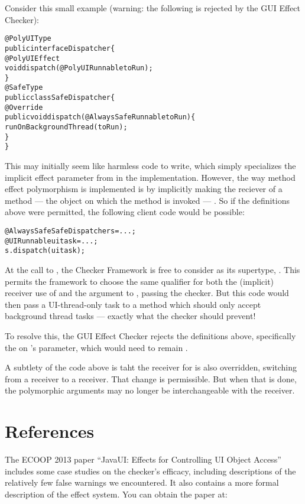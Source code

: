 Consider this small example (warning: the following is rejected by the GUI Effect Checker):

\begin{alltt}
@PolyUIType
public interface Dispatcher \{
    @PolyUIEffect
    void dispatch(@PolyUI Runnable toRun);
\}
@SafeType
public class SafeDispatcher \{
    @Override
    public void dispatch(@AlwaysSafe Runnable toRun) \{
        runOnBackgroundThread(toRun);
    \}
\}
\end{alltt}

This may initially seem like harmless code to write, which simply specializes the implicit effect
parameter from  in the  implementation.  However, the way
method effect polymorphism is implemented is by implicitly making the reciever of a
 method --- the object on which the method is invoked --- .  So
if the definitions above were permitted, the following client code would be possible:

\begin{alltt}
@AlwaysSafe SafeDispatcher s = ...;
@UI Runnable uitask = ...;
s.dispatch(uitask);
\end{alltt}

At the call to , the Checker Framework is free to consider  as its
supertype, .  This permits the framework to choose the same qualifier for
both the (implicit) receiver use of  and the  argument to
, passing the checker.  But this code would then pass a UI-thread-only
task to a method which should only accept background thread tasks --- exactly what the checker
should prevent!

To resolve this, the GUI Effect Checker rejects the definitions above, specifically the
 on 's parameter, which would need to remain
.

A subtlety of the code above is taht the receiver for  is also
overridden, switching from a  receiver to a  receiver.  That change is
permissible.  But when that is done, the polymorphic arguments may no longer be interchangeable
with the receiver.


\section{References\label{guieffect-references}}

The ECOOP 2013 paper ``JavaUI: Effects for Controlling UI Object Access''
    includes some case
    studies on the checker's efficacy, including descriptions of the relatively few false warnings
    we encountered.
    It also contains a more formal description of the effect system.
    You can obtain the paper at: \\


